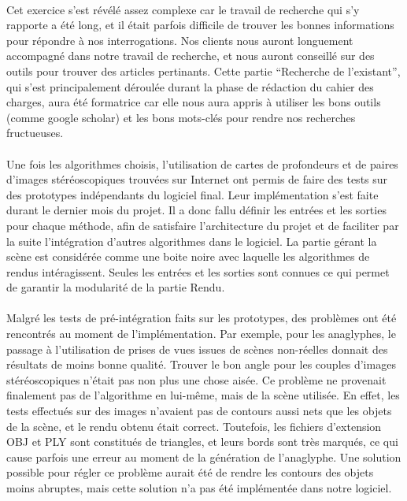 \paragraph{}
Cet exercice s'est révélé assez complexe car le travail de recherche qui s'y rapporte a été long, et il était parfois difficile de trouver les bonnes informations pour répondre à nos interrogations. Nos clients nous auront longuement accompagné dans notre travail de recherche, et nous auront conseillé sur des outils pour trouver des articles pertinants. Cette partie ``Recherche de l'existant'', qui s'est principalement déroulée durant la phase de rédaction du cahier des charges, aura été formatrice car elle nous aura appris à utiliser les bons outils (comme google scholar\footnotemark) et les bons mots-clés pour rendre nos recherches fructueuses.
\paragraph{}
Une fois les algorithmes choisis, l'utilisation de cartes de profondeurs et de paires d'images stéréoscopiques trouvées sur Internet ont permis de faire des tests sur des prototypes indépendants du logiciel final. Leur implémentation s'est faite durant le dernier mois du projet. Il a donc fallu définir les entrées et les sorties pour chaque méthode, afin de satisfaire l'architecture du projet et de faciliter par la suite l'intégration d'autres algorithmes dans le logiciel.
La partie gérant la scène est considérée comme une boite noire avec laquelle les algorithmes de rendus intéragissent. Seules les entrées et les sorties sont connues ce qui permet de garantir la modularité de la partie Rendu. 

\paragraph{}
Malgré les tests de pré-intégration faits sur les prototypes, des problèmes ont été rencontrés au moment de l'implémentation. Par exemple, pour les anaglyphes, le passage à l'utilisation de prises de vues issues de scènes non-réelles donnait des résultats de moins bonne qualité. Trouver le bon angle pour les couples d'images stéréoscopiques n'était pas non plus une chose aisée.
Ce problème ne provenait finalement pas de l'algorithme en lui-même, mais de la scène utilisée. En effet, les tests effectués sur des images n'avaient pas de contours aussi nets que les objets de la scène, et le rendu obtenu était correct. Toutefois, les fichiers d'extension OBJ et PLY sont constitués de triangles, et leurs bords sont très marqués, ce qui cause parfois une erreur au moment de la génération de l'anaglyphe. Une solution possible pour régler ce problème aurait été de rendre les contours des objets moins abruptes, mais cette solution n'a pas été implémentée dans notre logiciel.


